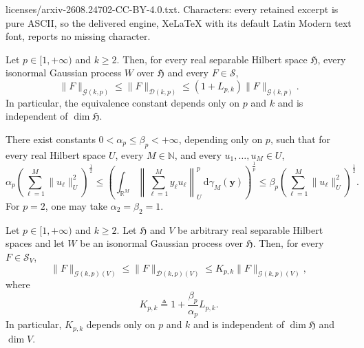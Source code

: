 \documentclass[10pt,a4paper]{amsart}
\begin{document}
licenses/arxiv-2608.24702-CC-BY-4.0.txt. Characters: every retained excerpt is pure ASCII, so the delivered engine, XeLaTeX with its default Latin Modern text font, reports no missing character.
\begin{theorem}
	\label{thm:scalar-malliavin-equivalence-all-p-k}
	Let $p\in[1,+\infty)$ and $k\geqslant2$.  Then, for every real separable Hilbert space $\mathfrak{H}$, every isonormal Gaussian process $W$ over $\mathfrak{H}$ and every $F\in\mathcal{S}$,
	$$
	\|F\|_{\mathcal{G}(k,p)}
	\leqslant
	\|F\|_{\mathcal{D}(k,p)}
	\leqslant
	(1+L_{p,k})\|F\|_{\mathcal{G}(k,p)}.
	$$
	In particular, the equivalence constant depends only on $p$ and $k$ and is independent of $\dim\mathfrak{H}$.
\end{theorem}

\begin{lemma}
	\label{lem:gaussian-randomization-hilbert}
There exist constants
	$0<\alpha_p\leqslant\beta_p<+\infty$, depending only on $p$, such that
	for every real Hilbert space $U$, every $M\in\mathbb{N}$, and every
	$u_1,\ldots,u_M\in U$,
	\[
	\alpha_p
	\left(\sum_{\ell=1}^{M}\|u_\ell\|_U^2\right)^{\frac12}
	\leqslant
	\left(
	\int_{\mathbb{R}^M}
	\left\|\sum_{\ell=1}^{M}y_\ell u_\ell\right\|_U^p
	\,\mathrm{d}\gamma_M(\mathbf{y})
	\right)^{\frac1p}
	\leqslant
	\beta_p
	\left(\sum_{\ell=1}^{M}\|u_\ell\|_U^2\right)^{\frac12}.
	\]
	For $p=2$, one may take $\alpha_2=\beta_2=1$.
\end{lemma}

\begin{theorem}
	\label{thm:vector-malliavin-equivalence-all-p-k}
	Let $p\in[1,+\infty)$ and $k\geqslant2$.  Let $\mathfrak{H}$ and $V$ be arbitrary real separable Hilbert spaces and let $W$ be an isonormal Gaussian process over $\mathfrak{H}$.  Then, for every $F\in\mathcal{S}_{V}$,
	$$
	\|F\|_{\mathcal{G}(k,p)(V)}
	\leqslant
	\|F\|_{\mathcal{D}(k,p)(V)}
	\leqslant
	K_{p,k}\|F\|_{\mathcal{G}(k,p)(V)},
	$$
	where
	$$
	K_{p,k}
	\triangleq
	1+\frac{\beta_{p}}{\alpha_{p}}L_{p,k}.
	$$
	In particular, $K_{p,k}$ depends only on $p$ and $k$ and is independent of $\dim\mathfrak{H}$ and $\dim V$.
\end{theorem}
\end{document}
